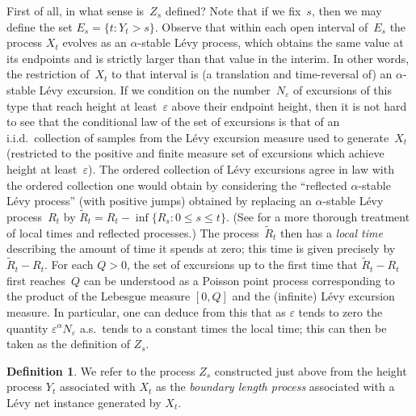 \documentclass[10pt]{amsart}
\let\epsilon\varepsilon
\theoremstyle{plain}
\numberwithin{theorem}{section}
\theoremstyle{definition}
\newtheorem{definition}[theorem]{Definition}
\let\wt\widetilde
\begin{document}
First of all, in what sense is~$Z_s$ defined? Note that if we fix~$s$, then we may define the set $E_s = \{t : Y_t > s \}$. Observe that within each open interval of~$E_s$ the process $X_t$ evolves as an $\alpha$-stable Lévy process, which obtains the same value at its endpoints and is strictly larger than that value in the interim. In other words, the restriction of~$X_t$ to that interval is (a translation and time-reversal of) an $\alpha$-stable Lévy excursion. If we condition on the number~$N_\epsilon$ of excursions of this type that reach height at least~$\epsilon$ above their endpoint height, then it is not hard to see that the conditional law of the set of excursions is that of an i.i.d.\ collection of samples from the Lévy excursion measure used to generate~$X_t$ (restricted to the positive and finite measure set of excursions which achieve height at least~$\epsilon$). The ordered collection of Lévy excursions agree in law with the ordered collection one would obtain by considering the ``reflected $\alpha$-stable Lévy process'' (with positive jumps) obtained by replacing an $\alpha$-stable Lévy process~$R_t$ by $\wt{R}_t = R_t - \inf \{R_s: 0 \leq s \leq t \}$. (See \cite{bertoinlevybook} for a more thorough treatment of local times and reflected processes.) The process~$\wt{R}_t$ then has a \emph{local time} describing the amount of time it spends at zero; this time is given precisely by $\wt{R}_t - R_t$. For each $Q > 0$, the set of excursions up to the first time that $\wt{R}_t - R_t$ first reaches~$Q$ can be understood as a Poisson point process corresponding to the product of the Lebesgue measure $[0,Q]$ and the (infinite) Lévy excursion measure. In particular, one can deduce from this that as $\epsilon$ tends to zero the quantity $\epsilon^\alpha N_\epsilon$ a.s.\ tends to a constant times the local time; this can then be taken as the definition of $Z_s$.

\begin{definition}
\label{def::levycb}
We refer to the process $Z_s$ constructed just above from the height process $Y_t$ associated with $X_t$ as the \emph{boundary length process} associated with a Lévy net instance generated by $X_t$.
\end{definition}
\end{document}

